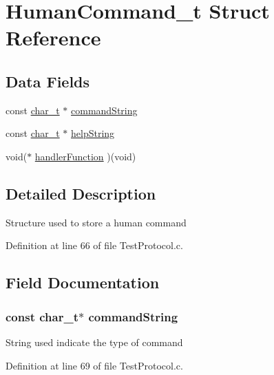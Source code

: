 \hypertarget{struct_human_command__t}{\section{Human\-Command\-\_\-t Struct Reference}
\label{struct_human_command__t}
}
\subsection*{Data Fields}
\begin{DoxyCompactItemize}
\item 
const \hyperlink{_project_types_8h_a40bb5262bf908c328fbcfbe5d29d0201}{char\-\_\-t} $\ast$ \hyperlink{struct_human_command__t_a808a3de0e57fcebda65290ff933391c9}{command\-String}
\item 
const \hyperlink{_project_types_8h_a40bb5262bf908c328fbcfbe5d29d0201}{char\-\_\-t} $\ast$ \hyperlink{struct_human_command__t_a66b03d84bdbad5159adaa74f6bd89c17}{help\-String}
\item 
void($\ast$ \hyperlink{struct_human_command__t_aada4fa790805e28d3885209a6d22daf2}{handler\-Function} )(void)
\end{DoxyCompactItemize}


\subsection{Detailed Description}
Structure used to store a human command 

Definition at line 66 of file Test\-Protocol.\-c.



\subsection{Field Documentation}
\hypertarget{struct_human_command__t_a808a3de0e57fcebda65290ff933391c9}{
\subsubsection[{command\-String}]{\setlength{\rightskip}{0pt plus 5cm}const {\bf char\-\_\-t}$\ast$ command\-String}}\label{struct_human_command__t_a808a3de0e57fcebda65290ff933391c9}
String used indicate the type of command 

Definition at line 69 of file Test\-Protocol.\-c.

